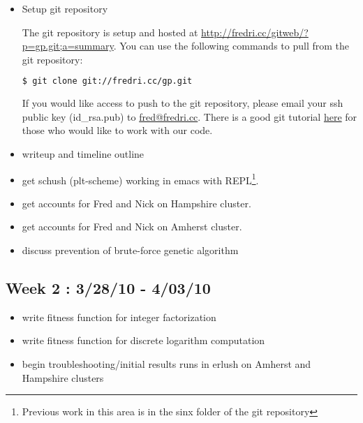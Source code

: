 \documentclass{article}
\begin{document}
\begin{itemize}

  \item Setup git repository 

The git repository is setup and hosted at \href{http://fredri.cc/gitweb/?p=gp.git;a=summary}{http://fredri.cc/gitweb/?p=gp.git;a=summary}. You can use the following commands to pull from the git repository: 

\begin{lstlisting}[language=bash,frame=single]
$ git clone git://fredri.cc/gp.git
\end{lstlisting}

If you would like access to push to the git repository, please email your ssh public key (id\_rsa.pub) to \href{mailto:fred@fredri.cc}{fred@fredri.cc}. There is a good git tutorial \href{http://www.kernel.org/pub/software/scm/git/docs/gittutorial.html}{here} for those who would like to work with our code. 

  \item writeup and timeline outline 

  \item get schush (plt-scheme) working in emacs with REPL\footnote{Previous work in this area is in the sinx folder of the git repository}. 

  \item get accounts for Fred and Nick on Hampshire cluster.

  \item get accounts for Fred and Nick on Amherst cluster.

  \item discuss prevention of brute-force genetic algorithm 

\end{itemize}

\subsection{Week 2 : 3/28/10 - 4/03/10}

\begin{itemize}
  \item write fitness function for integer factorization 

  \item write fitness function for discrete logarithm computation 

  \item begin troubleshooting/initial results runs in erlush on Amherst and Hampshire clusters 

\end{itemize}
\end{document}
